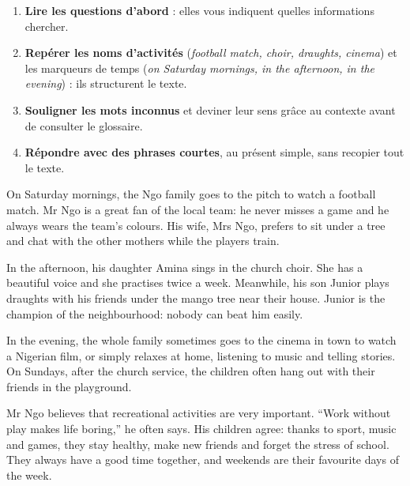 \documentclass[11pt]{article}
\newcommand{\cle}[1]{{\popxbold\color{popdark}#1}}
\newcounter{popsec}
\newcounter{popsub}
\newcommand{\courssub}[1]{%
  \stepcounter{popsub}%
  \par\vspace{9pt}\noindent{\popxbold\fontsize{11.5}{13}\selectfont\color{popink}{\color{poporange}\thepopsec.\thepopsub}\hspace{6pt}#1}\par\nopagebreak\vspace{4pt}
}
\begin{document}
\courssub{Lecture : \emph{Weekend Fun in Yaoundé}}

\begin{methode}
\begin{enumerate}
\item \textbf{Lire les questions d'abord} : elles vous indiquent quelles informations chercher.
\item \textbf{Repérer les noms d'activités} (\emph{football match, choir, draughts, cinema}) et les \cle{marqueurs de temps} (\emph{on Saturday mornings, in the afternoon, in the evening}) : ils structurent le texte.
\item \textbf{Souligner les mots inconnus} et deviner leur sens grâce au contexte avant de consulter le glossaire.
\item \textbf{Répondre avec des phrases courtes}, au présent simple, sans recopier tout le texte.
\end{enumerate}
\end{methode}

\begin{textebox}
On Saturday mornings, the Ngo family goes to the pitch to watch a football match. Mr Ngo is a great fan of the local team: he never misses a game and he always wears the team's colours. His wife, Mrs Ngo, prefers to sit under a tree and chat with the other mothers while the players train.

In the afternoon, his daughter Amina sings in the church choir. She has a beautiful voice and she practises twice a week. Meanwhile, his son Junior plays draughts with his friends under the mango tree near their house. Junior is the champion of the neighbourhood: nobody can beat him easily.

In the evening, the whole family sometimes goes to the cinema in town to watch a Nigerian film, or simply relaxes at home, listening to music and telling stories. On Sundays, after the church service, the children often hang out with their friends in the playground.

Mr Ngo believes that recreational activities are very important. “Work without play makes life boring,” he often says. His children agree: thanks to sport, music and games, they stay healthy, make new friends and forget the stress of school. They always have a good time together, and weekends are their favourite days of the week.
\end{textebox}
\end{document}
